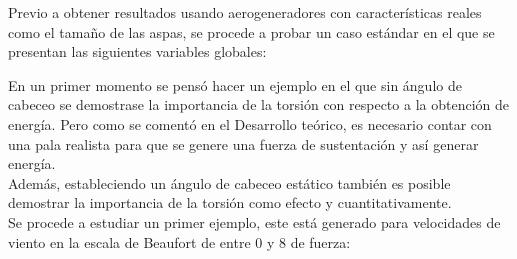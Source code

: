 Previo a obtener resultados usando aerogeneradores con características reales como el tamaño de las aspas, se procede a probar un caso estándar en el que se presentan las siguientes variables globales:

\begin{table}[H]
\centering
{}
\end{table}

En un primer momento se pensó hacer un ejemplo en el que sin ángulo de cabeceo se demostrase la importancia de la torsión con respecto a la obtención de energía. Pero como se comentó en el Desarrollo teórico, es necesario contar con una pala realista para que se genere una fuerza de sustentación y así generar energía. \\

Además, estableciendo un ángulo de cabeceo estático también es posible demostrar la importancia de la torsión como efecto y cuantitativamente.\\

Se procede a estudiar un primer ejemplo, este está generado para velocidades de viento en la escala de Beaufort de entre 0 y 8 de fuerza:


